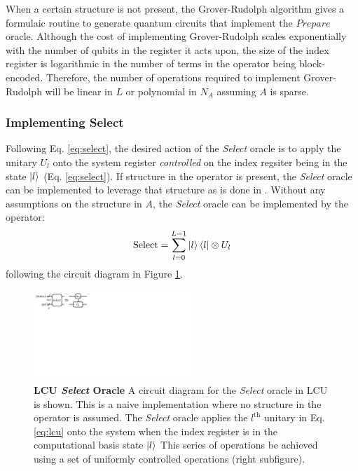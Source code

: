 When a certain structure is not present, the Grover-Rudolph algorithm \cite{grover2002creating} gives a formulaic routine to generate quantum circuits that implement the $\textit{Prepare}$ oracle.
Although the cost of implementing Grover-Rudolph scales exponentially with the number of qubits in the register it acts upon, the size of the index register is logarithmic in the number of terms in the operator being block-encoded.
Therefore, the number of operations required to implement Grover-Rudolph will be linear in $L$ or polynomial in $N_A$ assuming $A$ is sparse.

\subsubsection{Implementing \textbf{Select}}

Following Eq. \ref{eq:select}, the desired action of the \textit{Select} oracle is to apply the unitary $U_l$ onto the system register \textit{controlled} on the index regsiter being in the state $\ket{l}$ (Eq. \ref{eq:select}).
If structure in the operator is present, the \textit{Select} oracle can be implemented to leverage that structure as is done in \cite{babbush2018encoding}.
Without any assumptions on the structure in $A$, the \textit{Select} oracle can be implemented by the operator:
\begin{equation}
    \label{eq:select-naive}
    \text{Select} = \sum_{l=0}^{L-1} \ket{l}\bra{l} \otimes U_l
\end{equation}
following the circuit diagram in Figure \ref{fig:unstructured-select}.

\begin{figure}[h]
    \includegraphics[width=6cm]{figures/select-lcu.pdf}
    \caption{
        \textbf{LCU \textit{Select} Oracle}
        A circuit diagram for the \textit{Select} oracle in LCU is shown.
        This is a naive implementation where no structure in the operator is assumed.
        The \textit{Select} oracle applies the $l^\text{th}$ unitary in Eq. \ref{eq:lcu} onto the system when the index register is in the computational basis state $\ket{l}$
        This series of operations be achieved using a set of uniformly controlled operations (right subfigure).
    }
    \label{fig:unstructured-select}
\end{figure}

